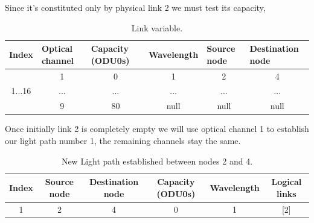 Since it's constituted only by physical link 2 we must test its capacity, 
\begin{table}[H]
	\centering
	\begin{tabular}{|c|c|c|c|c|c|}
		\hline
		\multicolumn{1}{|l|}{Index} & \multicolumn{1}{l|}{Optical channel} & \multicolumn{1}{l|}{Capacity (ODU0s)} & \multicolumn{1}{l|}{Wavelength} & \multicolumn{1}{l|}{Source node} & \multicolumn{1}{l|}{Destination node} \\ \hline
		\multirow{3}{*}{1...16}     & 1                                    & 0                                    & 1                            & 2                             & 4                                  \\ \cline{2-6} 
		& ...                                  & ...                                   & ...                             & ...                              & ...                                   \\ \cline{2-6} 
		& 9                                  & 80                                    & null                            & null                             & null                                  \\ \hline
	\end{tabular}
	\caption{Link variable.}
	\label{link_example}
\end{table}

Once initially link 2 is completely empty we will use optical channel 1 to establish our light path number 1, the remaining channels stay the same.

\begin{table}[H]
	\centering
	\begin{tabular}{|c|c|c|c|c|c|}
		\hline
		Index                   & Source node                & Destination node           & Capacity (ODU0s)        & Wavelength & Logical links                  \\ \hline
		\multicolumn{1}{|c|}{1} & \multicolumn{1}{c|}{2} & \multicolumn{1}{c|}{4} & \multicolumn{1}{c|}{0} & \multicolumn{1}{c|}{1} & \multicolumn{1}{c|}{[2]}\\ \hline
	\end{tabular}
	\caption{New Light path established between nodes 2 and 4.}
	\label{lightpath_example}
\end{table}

